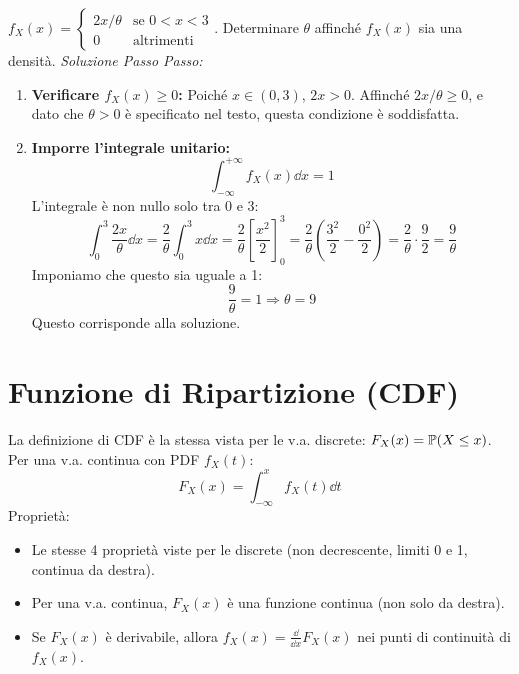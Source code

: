 \documentclass[12pt,a4paper]{article}
\begin{document}
\begin{example}
\begin{example}
$f_X(x) = \begin{cases} 2x/\theta & \text{se } 0 < x < 3 \\ 0 & \text{altrimenti} \end{cases}$. Determinare $\theta$ affinché $f_X(x)$ sia una densità.
\textit{Soluzione Passo Passo:}
\begin{enumerate}
    \item \textbf{Verificare $f_X(x) \ge 0$:}
    Poiché $x \in (0,3)$, $2x > 0$. Affinché $2x/\theta \ge 0$, e dato che $\theta>0$ è specificato nel testo, questa condizione è soddisfatta.
    \item \textbf{Imporre l'integrale unitario:}
    \[ \int_{-\infty}^{+\infty} f_X(x) \dd x = 1 \]
    L'integrale è non nullo solo tra 0 e 3:
    \[ \int_0^3 \frac{2x}{\theta} \dd x = \frac{2}{\theta} \int_0^3 x \dd x = \frac{2}{\theta} \left[ \frac{x^2}{2} \right]_0^3 = \frac{2}{\theta} \left( \frac{3^2}{2} - \frac{0^2}{2} \right) = \frac{2}{\theta} \cdot \frac{9}{2} = \frac{9}{\theta} \]
    Imponiamo che questo sia uguale a 1:
    \[ \frac{9}{\theta} = 1 \Rightarrow \theta = 9 \]
    Questo corrisponde alla soluzione.
\end{enumerate}
\end{example}

\section{Funzione di Ripartizione (CDF)}
La definizione di CDF è la stessa vista per le v.a. discrete: $F_X(x) = \mathbb{P}(X \le x)$.
Per una v.a. continua con PDF $f_X(t)$:
\[ F_X(x) = \int_{-\infty}^x f_X(t) \dd t \]
Proprietà:
\begin{itemize}
    \item Le stesse 4 proprietà viste per le discrete (non decrescente, limiti 0 e 1, continua da destra).
    \item Per una v.a. continua, $F_X(x)$ è una funzione continua (non solo da destra).
    \item Se $F_X(x)$ è derivabile, allora $f_X(x) = \frac{\dd}{\dd x} F_X(x)$ nei punti di continuità di $f_X(x)$.
\end{itemize}


\end{example}
\end{document}
